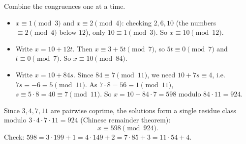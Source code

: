 Combine the congruences one at a time.
\begin{itemize}
\item $x\equiv1\pmod3$ and $x\equiv2\pmod4$: checking $2,6,10$ (the numbers $\equiv2\pmod4$ below $12$), only $10\equiv1\pmod3$. So $x\equiv10\pmod{12}$.
\item Write $x=10+12t$. Then $x\equiv3+5t\pmod7$, so $5t\equiv0\pmod7$ and $t\equiv0\pmod7$. So $x\equiv10\pmod{84}$.
\item Write $x=10+84s$. Since $84\equiv7\pmod{11}$, we need $10+7s\equiv4$, i.e. $7s\equiv-6\equiv5\pmod{11}$. As $7\cdot8=56\equiv1\pmod{11}$, $s\equiv5\cdot8=40\equiv7\pmod{11}$. So $x=10+84\cdot7=598$ modulo $84\cdot11=924$.
\end{itemize}
Since $3,4,7,11$ are pairwise coprime, the solutions form a single residue class modulo $3\cdot4\cdot7\cdot11=924$ (Chinese remainder theorem):
\[\boxed{x\equiv598\pmod{924}}.\]
Check: $598=3\cdot199+1=4\cdot149+2=7\cdot85+3=11\cdot54+4$.
